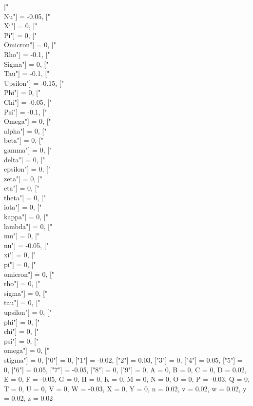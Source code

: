 {{        ["\\Nu"] = -0.05, ["\\Xi"] = 0, ["\\Pi"] = 0,
        ["\\Omicron"] = 0, ["\\Rho"] = -0.1, ["\\Sigma"] = 0,
        ["\\Tau"] = -0.1, ["\\Upsilon"] = -0.15, ["\\Phi"] = 0,
        ["\\Chi"] = -0.05, ["\\Psi"] = -0.1, ["\\Omega"] = 0,
        ["\\alpha"] = 0, ["\\beta"] = 0, ["\\gamma"] = 0,
        ["\\delta"] = 0, ["\\epsilon"] = 0, ["\\zeta"] = 0,
        ["\\eta"] = 0, ["\\theta"] = 0, ["\\iota"] = 0,
        ["\\kappa"] = 0, ["\\lambda"] = 0, ["\\mu"] = 0,
        ["\\nu"] = -0.05, ["\\xi"] = 0, ["\\pi"] = 0,
        ["\\omicron"] = 0, ["\\rho"] = 0, ["\\sigma"] = 0,
        ["\\tau"] = 0, ["\\upsilon"] = 0, ["\\phi"] = 0,
        ["\\chi"] = 0, ["\\psi"] = 0, ["\\omega"] = 0, ["\\stigma"] = 0,
        ["0"] = 0, ["1"] = -0.02, ["2"] = 0.03, ["3"] = 0, ["4"] = 0.05,
        ["5"] = 0, ["6"] = 0.05, ["7"] = -0.05, ["8"] = 0, ["9"] = 0,
        A = 0, B = 0, C = 0, D = 0.02, E = 0, F = -0.05,
        G = 0, H = 0, K = 0, M = 0, N = 0, O = 0, P = -0.03,
        Q = 0, T = 0, U = 0, V = 0, W = -0.03, X = 0, Y = 0,
        n = 0.02, v = 0.02, w = 0.02, y = 0.02, z = 0.02
    }
}

